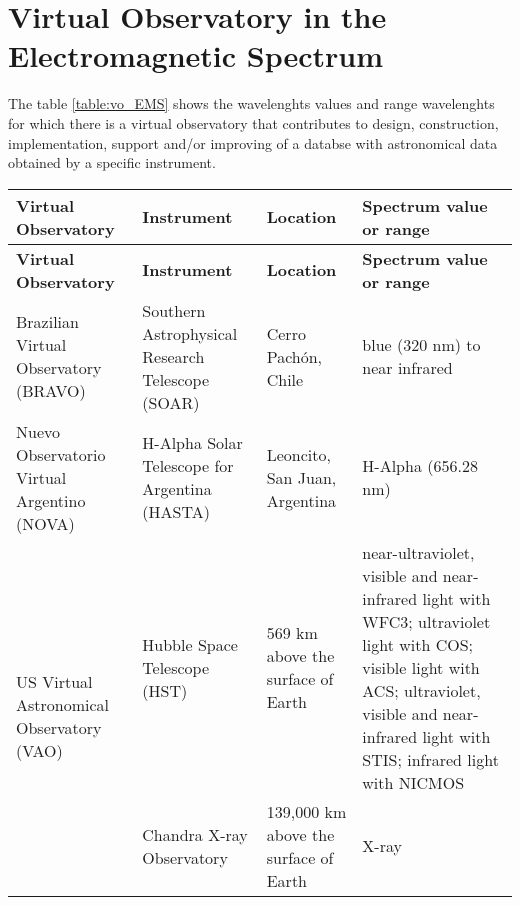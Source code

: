 \section{Virtual Observatory in the Electromagnetic Spectrum}
The table \ref{table:vo_EMS} shows the wavelenghts values and range wavelenghts
for which there is a virtual observatory that contributes to design,
construction, implementation, support and/or improving of a databse with
astronomical data obtained by a specific instrument.\\

\begin{center}  
\begin{longtable}{|m{3cm}|m{3cm}|m{3cm}|m{5cm}|}
    \hline                                                                      
    \textbf{Virtual Observatory} & \textbf{Instrument} & \textbf{Location} &
    \textbf{Spectrum value or range} \\
    \hline                                                                      
    \endfirsthead
    \hline                                                                      
    \textbf{Virtual Observatory} & \textbf{Instrument} & \textbf{Location} &
    \textbf{Spectrum value or range} \\
    \hline                                                                      
    \endhead
    Brazilian Virtual Observatory (BRAVO) & Southern Astrophysical Research
    Telescope (SOAR) & Cerro Pach\'{o}n, Chile & blue (320 nm) to near infrared
    \\
    \hline                                                                      
    Nuevo Observatorio Virtual Argentino (NOVA) & H-Alpha Solar Telescope for
    Argentina (HASTA) & Leoncito, San Juan, Argentina & H-Alpha (656.28 nm) \\
    \hline
    \multirow{3}{3cm}{US Virtual Astronomical Observatory (VAO)} & Hubble Space
    Telescope (HST) & 569 km above the surface of Earth & near-ultraviolet,
    visible and near-infrared light with WFC3; ultraviolet light with COS;
    visible light with ACS; ultraviolet, visible and near-infrared light with
    STIS; infrared light with NICMOS \\
     \cline{2-4}
     & Chandra X-ray Observatory & 139,000 km above the surface of Earth & X-ray
     \\

\end{longtable}
\end{center}
